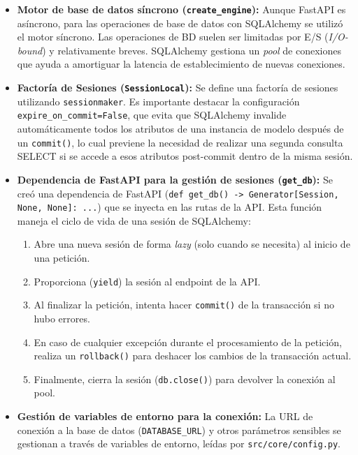 \begin{itemize}[leftmargin=*]
  \item \textbf{Motor de base de datos síncrono (\texttt{create\_engine}):} Aunque FastAPI es asíncrono, para las operaciones de base de datos con SQLAlchemy se utilizó el motor síncrono. Las operaciones de BD suelen ser limitadas por E/S (\textit{I/O-bound}) y relativamente breves. SQLAlchemy gestiona un \emph{pool} de conexiones que ayuda a amortiguar la latencia de establecimiento de nuevas conexiones.
  \item \textbf{Factoría de Sesiones (\texttt{SessionLocal}):} Se define una factoría de sesiones utilizando \texttt{sessionmaker}. Es importante destacar la configuración \texttt{expire\_on\_commit=False}, que evita que SQLAlchemy invalide automáticamente todos los atributos de una instancia de modelo después de un \texttt{commit()}, lo cual previene la necesidad de realizar una segunda consulta SELECT si se accede a esos atributos post-commit dentro de la misma sesión.
  \item \textbf{Dependencia de FastAPI para la gestión de sesiones (\texttt{get\_db}):} Se creó una dependencia de FastAPI (\texttt{def get\_db() -> Generator[Session, None, None]: ...}) que se inyecta en las rutas de la API. Esta función maneja el ciclo de vida de una sesión de SQLAlchemy:
        \begin{enumerate}
            \item Abre una nueva sesión de forma \emph{lazy} (solo cuando se necesita) al inicio de una petición.
            \item Proporciona (\texttt{yield}) la sesión al endpoint de la API.
            \item Al finalizar la petición, intenta hacer \texttt{commit()} de la transacción si no hubo errores.
            \item En caso de cualquier excepción durante el procesamiento de la petición, realiza un \texttt{rollback()} para deshacer los cambios de la transacción actual.
            \item Finalmente, cierra la sesión (\texttt{db.close()}) para devolver la conexión al pool.
        \end{enumerate}
  \item \textbf{Gestión de variables de entorno para la conexión:} La URL de conexión a la base de datos (\texttt{DATABASE\_URL}) y otros parámetros sensibles se gestionan a través de variables de entorno, leídas por \texttt{src/core/config.py}.
\end{itemize}

